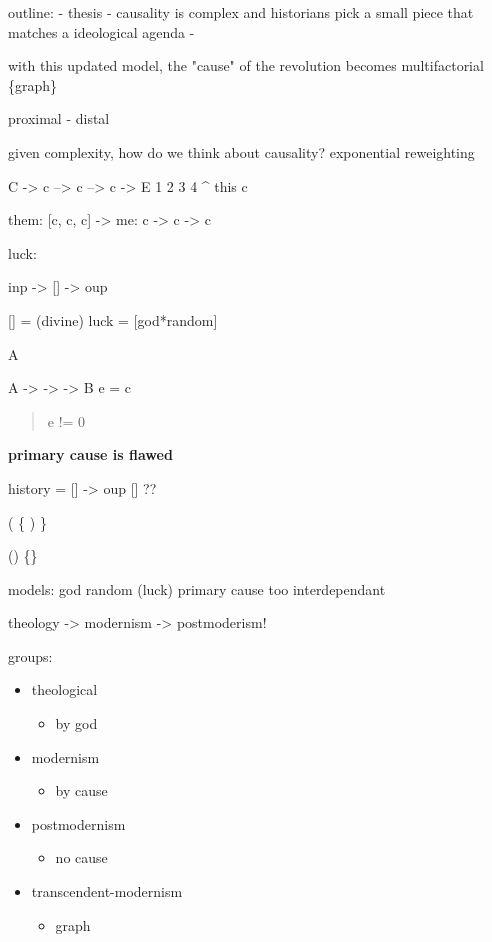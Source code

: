 \documentclass[letterpaper]{article}
\begin{document}
outline: - thesis - causality is complex and historians pick a small
piece that matches a ideological agenda -

with this updated model, the "cause" of the revolution becomes
multifactorial \{graph\}

proximal - distal

given complexity, how do we think about causality? exponential
reweighting

C -> c --> c --> c -> E 1 2 3 4 \^{} this c

them: [c, c, c] -> me: c -> c -> c

luck:

inp -> [] -> oup

[] = (divine) luck = [god*random]

A

A -> -> -> B e = c

\begin{verse}
e != 0\\
\end{verse}

\textbf{primary cause is flawed}

history = [] -> oup [] ??

( \{ ) \}

() \{\}

models: god random (luck) primary cause too interdependant

theology -> modernism -> postmoderism!

groups:

\begin{itemize}
\item theological

\begin{itemize}
\item by god
\end{itemize}

\item modernism

\begin{itemize}
\item by cause
\end{itemize}

\item postmodernism

\begin{itemize}
\item no cause
\end{itemize}

\item transcendent-modernism

\begin{itemize}
\item graph
\end{itemize}
\end{itemize}
\end{document}
